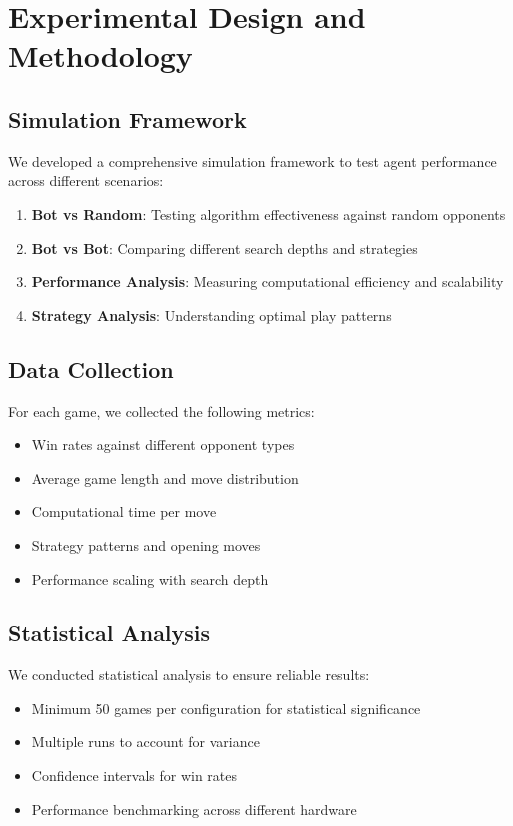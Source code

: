\documentclass[12pt]{article}
\begin{document}
\section{Experimental Design and Methodology}

\subsection{Simulation Framework}

We developed a comprehensive simulation framework to test agent performance across different scenarios:

\begin{enumerate}
    \item \textbf{Bot vs Random}: Testing algorithm effectiveness against random opponents
\item \textbf{Bot vs Bot}: Comparing different search depths and strategies
    \item \textbf{Performance Analysis}: Measuring computational efficiency and scalability
    \item \textbf{Strategy Analysis}: Understanding optimal play patterns
\end{enumerate}

\subsection{Data Collection}

For each game, we collected the following metrics:
\begin{itemize}
    \item Win rates against different opponent types
    \item Average game length and move distribution
    \item Computational time per move
    \item Strategy patterns and opening moves
    \item Performance scaling with search depth
\end{itemize}

\subsection{Statistical Analysis}

We conducted statistical analysis to ensure reliable results:
\begin{itemize}
    \item Minimum 50 games per configuration for statistical significance
    \item Multiple runs to account for variance
    \item Confidence intervals for win rates
    \item Performance benchmarking across different hardware
\end{itemize}
\end{document}
